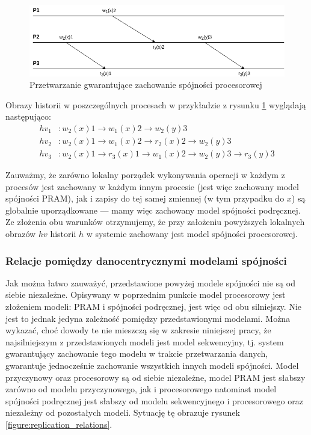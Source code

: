 \begin{figure}
    \includegraphics[width=\linewidth]{images/02-cpu.png}
    \caption{Przetwarzanie gwarantujące zachowanie spójności procesorowej}
    \label{figure:replication_cpu}
\end{figure}

Obrazy historii w poszczególnych procesach w przykładzie z rysunku \ref{figure:replication_cpu} wyglądają następująco:
\begin{align*}
    hv_1&: w_2(x)1 \rightarrow w_1(x)2 \rightarrow w_2(y)3 \\
    hv_2&: w_2(x)1 \rightarrow w_1(x)2 \rightarrow r_2(x)2 \rightarrow w_2(y)3 \\
    hv_3&: w_2(x)1 \rightarrow r_3(x)1 \rightarrow w_1(x)2 \rightarrow w_2(y)3 \rightarrow r_3(y)3
\end{align*}

Zauważmy, że zarówno lokalny porządek wykonywania operacji w każdym z procesów jest zachowany w każdym innym procesie (jest więc zachowany model spójności PRAM), jak i zapisy do tej samej zmiennej (w tym przypadku do $ x $) są globalnie uporządkowane --- mamy więc zachowany model spójności podręcznej. Ze złożenia obu warunków otrzymujemy, że przy założeniu powyższych lokalnych obrazów $ hv $ historii $ h $ w systemie zachowany jest model spójności procesorowej.

\subsubsection{Relacje pomiędzy danocentrycznymi modelami spójności}

Jak można łatwo zauważyć, przedstawione powyżej modele spójności nie są od siebie niezależne. Opisywany w poprzednim punkcie model procesorowy jest złożeniem modeli: PRAM i spójności podręcznej, jest więc od obu silniejszy. Nie jest to jednak jedyna zależność pomiędzy przedstawionymi modelami. Można wykazać, choć dowody te nie mieszczą się w zakresie niniejszej pracy, że najsilniejszym z przedstawionych modeli jest model sekwencyjny, tj. system gwarantujący zachowanie tego modelu w trakcie przetwarzania danych, gwarantuje jednocześnie zachowanie wszystkich innych modeli spójności. Model przyczynowy oraz procesorowy są od siebie niezależne, model PRAM jest słabszy zarówno od modelu przyczynowego, jak i procesorowego natomiast model spójności podręcznej jest słabszy od modelu sekwencyjnego i procesorowego oraz niezależny od pozostałych modeli. Sytuację tę obrazuje rysunek \ref{figure:replication_relations}.

